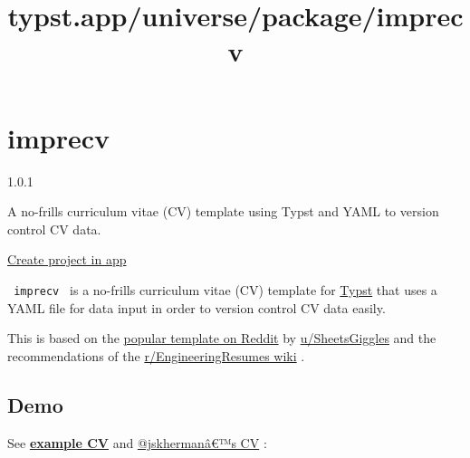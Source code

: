 \title{typst.app/universe/package/imprecv}

\label{banner}
\label{template-thumbnail}

\section{imprecv}\label{imprecv}

{ 1.0.1 }

A no-frills curriculum vitae (CV) template using Typst and YAML to
version control CV data.

\href{/app?template=imprecv&version=1.0.1}{Create project in app}

\label{readme}
\href{https://github.com/jskherman/imprecv/stargazers}{\pandocbounded{}}
\href{https://github.com/typst/packages/raw/main/packages/preview/imprecv/1.0.1/LICENSE}{}
\href{https://github.com/jskherman/imprecv/releases}{}

\texttt{\ imprecv\ } is a no-frills curriculum vitae (CV) template for
\href{https://github.com/typst/typst}{Typst} that uses a YAML file for
data input in order to version control CV data easily.

This is based on the
\href{https://web.archive.org/https://old.reddit.com/r/jobs/comments/7y8k6p/im_an_exrecruiter_for_some_of_the_top_companies/}{popular
template on Reddit} by
\href{https://web.archive.org/https://old.reddit.com/user/SheetsGiggles}{u/SheetsGiggles}
and the recommendations of the
\href{https://web.archive.org/https://old.reddit.com/r/EngineeringResumes/comments/m2cc65/new_and_improved_wiki}{r/EngineeringResumes
wiki} .

\subsection{Demo}\label{demo}

See
\href{https://github.com/jskherman/imprecv/releases/latest/download/example.pdf}{\textbf{example
CV}} and \href{https://go.jskherman.com/cv}{@jskhermanâ€™s CV} :

